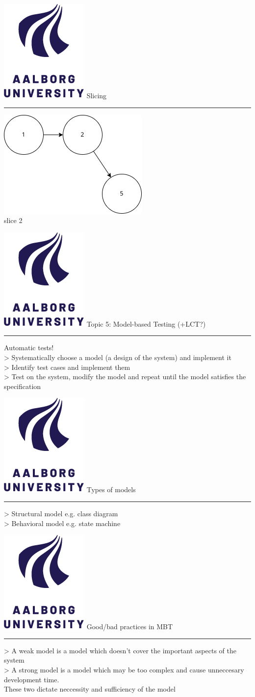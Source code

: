 \documentclass[aspectratio=1610,17pt,utf8]{beamer}
\newcommand{\mainframe}[1]{\color{blue} \includegraphics[width=.05\textwidth]{figures/aau.png} #1\\\hrule}
\newcommand{\mf}[1]{\mainframe{#1}}
\newcommand{\regularframe}[1]{\color{black}\includegraphics[width=.05\textwidth]{figures/aau.png} #1\\\hrule}
\newcommand{\rf}[1]{\regularframe{#1}}
\newcommand{\minip}[2]{\begin{minipage}{#1}#2\end{minipage}}
\begin{document}
\begin{frame}{\rf{Slicing}}
    \minip{.30\textwidth}{\centering\includegraphics[height=.5\textwidth]{figures/slice2.drawio.png}\\\tiny slice 2}
\end{frame}


\begin{frame}{\mf{Topic 5: Model-based Testing (+LCT?)}} %
    Automatic tests!\\
    > Systematically choose a model (a design of the system) and implement it\\
    > Identify test cases and implement them\\
    > Test on the system, modify the model and repeat until the model satisfies the specification
\end{frame}

\begin{frame}{\rf{Types of models}}
    > Structural model \color{gray} e.g. class diagram\\
    \color{black}> Behavioral model \color{gray} e.g. state machine
\end{frame}

\begin{frame}{\rf{Good/bad practices in MBT}}
    > A weak model is a model which doesn't cover the important aspects of the system\\
    > A strong model is a model which may be too complex and cause unneccesary development time.\\
    These two dictate neccessity and sufficiency of the model
\end{frame}
\end{document}

